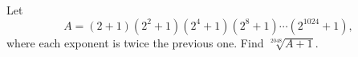 Let
\[A=(2+1)\left(2^2+1\right)\left(2^4+1\right)\left(2^8+1\right)\cdots\left(2^{1024}+1\right),\]
where each exponent is twice the previous one. Find $\sqrt[2048]{A+1}$.
